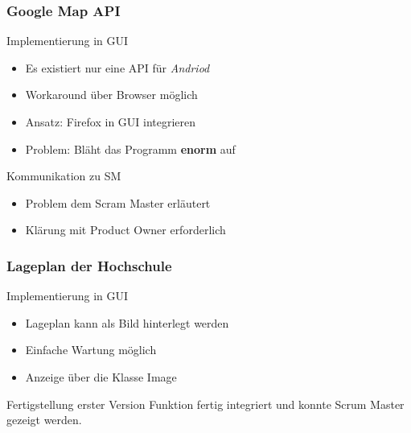 \begin{frame}
	\frametitle{Google Map API}
%
	\begin{block}{Implementierung in GUI}
		\begin{itemize}
			\item Es existiert nur eine API für \textit{Andriod}
			\item Workaround über Browser möglich
			\item Ansatz: Firefox in GUI integrieren
			\item Problem: Bläht das Programm \textbf{enorm} auf
		\end{itemize}
	\end{block}
%
	\begin{block}{Kommunikation zu SM}
		\begin{itemize}
			\item Problem dem Scram Master erläutert
			\item Klärung mit Product Owner erforderlich
		\end{itemize}
	\end{block}
\end{frame}
%
%
%
\begin{frame}
	\frametitle{Lageplan der Hochschule}
%
	\begin{block}{Implementierung in GUI}
		\begin{itemize}
			\item Lageplan kann als Bild hinterlegt werden
			\item Einfache Wartung möglich
			\item Anzeige über die Klasse Image
		\end{itemize}
	\end{block}
%
	\begin{block}{Fertigstellung erster Version}
		Funktion fertig integriert und konnte Scrum Master gezeigt werden.	
	\end{block}
\end{frame}
%
%
%
